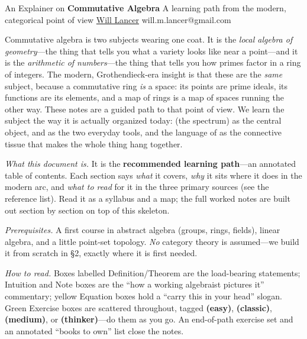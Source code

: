 \documentclass[11pt]{article}
\DeclareMathOperator{\Spec}{Spec}
\begin{document}
\thispagestyle{empty}
\bigskip
\vspace{0.1cm}

\begin{center}
{\fontsize{20}{20} \selectfont An Explainer on}
\vskip 14pt
{\fontsize{34}{34} \selectfont \bf \sffamily Commutative Algebra}
\vskip 10pt
{\fontsize{16}{16}\selectfont \sffamily A learning path from the modern, categorical point of view}
\vskip 22pt
{\fontsize{16}{16} \selectfont \rmfamily \href{https://will-lancer.github.io}{Will Lancer}}
\vskip 6pt
{\fontsize{12}{12} \selectfont \ttfamily will.m.lancer@gmail.com}
\vskip 18pt
\end{center}

{\parindent0pt \baselineskip=15.5pt}
\noin
Commutative algebra is two subjects wearing one coat. It is the \emph{local algebra of
geometry}---the thing that tells you what a variety looks like near a point---and it is
the \emph{arithmetic of numbers}---the thing that tells you how primes factor in a ring of
integers. The modern, Grothendieck-era insight is that these are the \emph{same} subject,
because a commutative ring \emph{is} a space: its points are prime ideals, its functions
are its elements, and a map of rings is a map of spaces running the other way. These notes
are a guided path to that point of view. We learn the subject the way it is actually
organized today: \vocab{$\Spec$} (the spectrum) as the central object,  and
 as the two everyday tools, and the language of  as the connective tissue that makes the whole
thing hang together.

\medskip
\noin
\emph{What this document is.} It is the \textbf{recommended learning path}---an annotated
table of contents. Each section says \emph{what} it covers, \emph{why} it sits where it
does in the modern arc, and \emph{what to read} for it in the three primary sources (see
the reference list). Read it as a syllabus and a map; the full worked notes are built out
section by section on top of this skeleton.

\medskip
\noin
\emph{Prerequisites.} A first course in abstract algebra (groups, rings, fields), linear
algebra, and a little point-set topology. \emph{No} category theory is assumed---we build
it from scratch in \S2, exactly where it is first needed.

\medskip
\noin
\emph{How to read.} Boxes labelled \textsf{Definition}/\textsf{Theorem} are the
load-bearing statements; \textsf{Intuition} and \textsf{Note} boxes are the ``how a working
algebraist pictures it'' commentary; yellow \textsf{Equation} boxes hold a ``carry this in
your head'' slogan. Green \textsf{Exercise} boxes are scattered throughout, tagged
\textbf{(easy)}, \textbf{(classic)}, \textbf{(medium)}, or \textbf{(thinker)}---do them as
you go. An end-of-path exercise set and an annotated ``books to own'' list close the notes.
\end{document}
